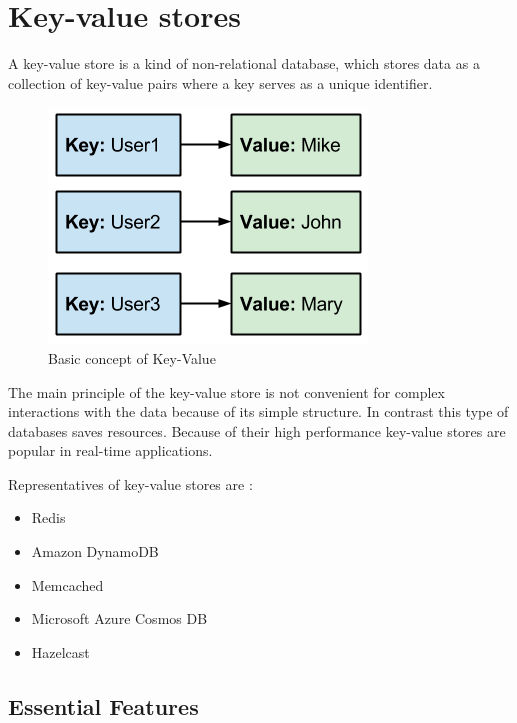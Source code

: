 \chapter{Key-value stores}
A key-value store is a kind of non-relational database, which stores data as a
collection of key-value pairs where a key serves as a unique identifier.
\begin{figure}[h]
    \centering
    \includegraphics[width=.5\textwidth]{images/keyvalue.png}
    \caption{Basic concept of Key-Value}
\end{figure}

The main principle of the key-value store is not convenient for complex
interactions with the data because of its simple structure. In contrast this
type of databases saves resources. Because of their high performance key-value
stores are popular in real-time applications.

Representatives of key-value stores are \cite{dbkeyvalue}:

\begin{itemize}
    \item Redis
    \item Amazon DynamoDB
    \item Memcached
    \item Microsoft Azure Cosmos DB
    \item Hazelcast
\end{itemize}

\section{Essential Features}
